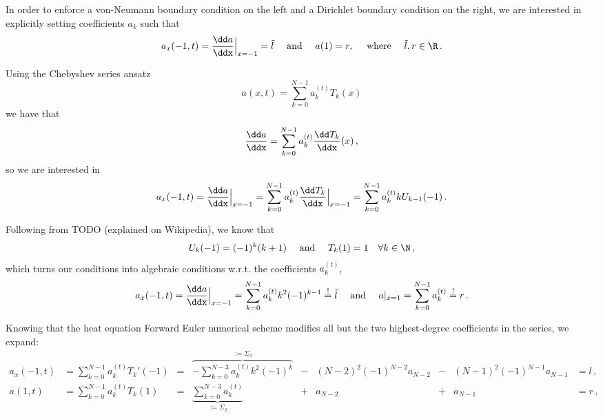 \documentclass{prettytex/ox/mmsc-special-topic}
\begin{document}
  In order to enforce a von-Neumann boundary condition on the left and a Dirichlet boundary condition on the right,
  we are interested in explicitly setting coefficients $a_k$ such that
  $$a_x(-1, t) = \frac{\dd a}{\ddx}\Big|_{x=-1} = \tilde{l} \quad \text{ and } \quad a(1) = r, \quad \text{ where } \quad \tilde{l}, r \in \R\,.$$

  Using the Chebyshev series ansatz
  $$a(x, t) = \sum_{k=0}^{N-1} a_k^{(t)} T_k(x)$$
  we have that
  $$\frac{\dd a}{\ddx} = \sum_{k=0}^{N-1} a_k^{(t)} \frac{\dd T_k}{\ddx}(x)\,,$$
  so we are interested in
  $$a_x(-1, t) = \frac{\dd a}{\ddx}\Big|_{x=-1} = \sum_{k=0}^{N-1} a_k^{(t)} \frac{\dd T_k}{\ddx}\Big|_{x=-1} = \sum_{k=0}^{N-1} a_k^{(t)} k U_{k-1}(-1)\,.$$

  Following from TODO (explained on Wikipedia), we know that
  $$U_k(-1) = (-1)^k (k+1) \quad \text{ and } \quad T_k(1) = 1 \quad \forall k \in \N\,,$$
  which turns our conditions into algebraic conditions w.r.t. the coefficients $a_k^{(t)}$,
  $$a_x(-1, t) = \frac{\dd a}{\ddx}\Big|_{x=-1} = \sum_{k=0}^{N-1} a_k^{(t)} k^2 (-1)^{k-1} \overset{!}{=} \tilde{l} \quad \text{ and } \quad a|_{x=1} = \sum_{k=0}^{N-1} a_k^{(t)} \overset{!}{=} r\,.$$

  Knowing that the heat equation Forward Euler numerical scheme modifies all but the two highest-degree coefficients in the series, we expand:
  \begin{align*}
    a_x(-1, t) & = \sum_{k=0}^{N-1} a_k^{(t)} T_k'(-1) & = & \overbrace{-\sum_{k=0}^{N-3} a_k^{(t)} k^2 (-1)^{k}}^{:= \Sigma_3} & - & (N-2)^2 (-1)^{N-2} a_{N-2} & - & (N-1)^2 (-1)^{N-1} a_{N-1} & = l\,, \\
    a(1, t)    & = \sum_{k=0}^{N-1} a_k^{(t)} T_k(1)   & = & \underbrace{\sum_{k=0}^{N-3} a_k^{(t)}}_{:= \Sigma_2}              & + & a_{N-2}                    & + & a_{N-1}                    & = r\,,
  \end{align*}
\end{document}
